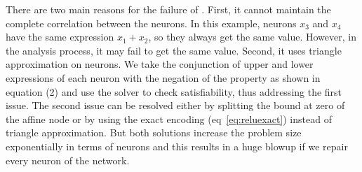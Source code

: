 \hspace*{-1cm}
\quad
{}  

There are two main reasons for the failure of \deeppoly{}. First, it cannot maintain the complete correlation 
between the neurons. In this example, neurons $x_3$ and $x_4$ have the same expression $x_1+x_2$, so they always
get the same value. However, in the \deeppoly{} analysis process, it may fail to get the same value. Second, it uses triangle
approximation on \relu{} neurons.
We take the conjunction of upper and lower expressions of each neuron with the negation of the property
as shown in equation (2) %
 and use the \milp{} solver to check satisfiability, thus addressing the first issue.  
The second issue can be resolved either by splitting the bound at zero of the 
affine node or by using the exact encoding (eq~\ref{eq:reluexact}) 
instead of triangle approximation. 
But both solutions increase the problem size exponentially in terms of \relu{} neurons and this results in a huge 
blowup if we repair every neuron of the network. 

